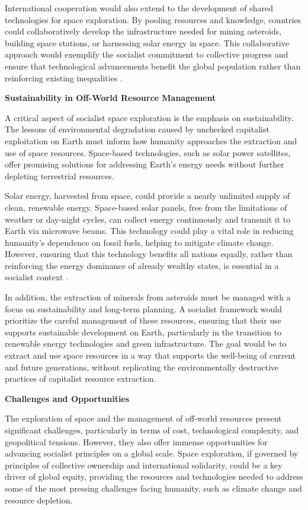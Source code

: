\begin{refsection}
International cooperation would also extend to the development of shared technologies for space exploration. By pooling resources and knowledge, countries could collaboratively develop the infrastructure needed for mining asteroids, building space stations, or harnessing solar energy in space. This collaborative approach would exemplify the socialist commitment to collective progress and ensure that technological advancements benefit the global population rather than reinforcing existing inequalities \cite[pp.~50-60]{chomsky_space_governance_2019}.

\textbf{Sustainability in Off-World Resource Management}

A critical aspect of socialist space exploration is the emphasis on sustainability. The lessons of environmental degradation caused by unchecked capitalist exploitation on Earth must inform how humanity approaches the extraction and use of space resources. Space-based technologies, such as solar power satellites, offer promising solutions for addressing Earth’s energy needs without further depleting terrestrial resources.

Solar energy, harvested from space, could provide a nearly unlimited supply of clean, renewable energy. Space-based solar panels, free from the limitations of weather or day-night cycles, can collect energy continuously and transmit it to Earth via microwave beams. This technology could play a vital role in reducing humanity’s dependence on fossil fuels, helping to mitigate climate change. However, ensuring that this technology benefits all nations equally, rather than reinforcing the energy dominance of already wealthy states, is essential in a socialist context \cite[pp.~1049-1067]{hayat_solar_2019}.

In addition, the extraction of minerals from asteroids must be managed with a focus on sustainability and long-term planning. A socialist framework would prioritize the careful management of these resources, ensuring that their use supports sustainable development on Earth, particularly in the transition to renewable energy technologies and green infrastructure. The goal would be to extract and use space resources in a way that supports the well-being of current and future generations, without replicating the environmentally destructive practices of capitalist resource extraction.

\textbf{Challenges and Opportunities}

The exploration of space and the management of off-world resources present significant challenges, particularly in terms of cost, technological complexity, and geopolitical tensions. However, they also offer immense opportunities for advancing socialist principles on a global scale. Space exploration, if governed by principles of collective ownership and international solidarity, could be a key driver of global equity, providing the resources and technologies needed to address some of the most pressing challenges facing humanity, such as climate change and resource depletion.


\end{refsection}
